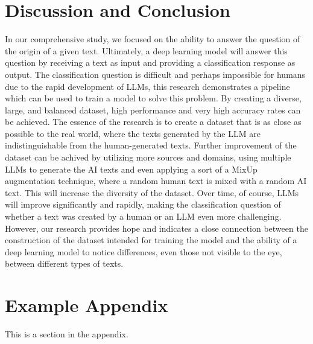 \documentclass[11pt]{article}
\begin{document}
\section{Discussion and Conclusion}
In our comprehensive study, we focused on the ability to answer the question of the origin of a given text. Ultimately, a deep learning model will answer this question by receiving a text as input and providing a classification response as output. The classification question is difficult and perhaps impossible for humans due to the rapid development of LLMs, this research demonstrates a pipeline which can be used to train a model to solve this problem. By creating a diverse, large, and balanced dataset, high performance and very high accuracy rates can be achieved.
The essence of the research is to create a dataset that is as close as possible to the real world, where the texts generated by the LLM are indistinguishable from the human-generated texts. Further improvement of the dataset can be achived by utilizing more sources and domains, using multiple LLMs to generate the AI texts and even applying a sort of a MixUp augmentation technique, where a random human text is mixed with a random AI text. This will increase the diversity of the dataset.
Over time, of course, LLMs will improve significantly and rapidly, making the classification question of whether a text was created by a human or an LLM even more challenging. However, our research provides hope and indicates a close connection between the construction of the dataset intended for training the model and the ability of a deep learning model to notice differences, even those not visible to the eye, between different types of texts.




\appendix

\section{Example Appendix}
\label{sec:appendix}

This is a section in the appendix.
\end{document}
